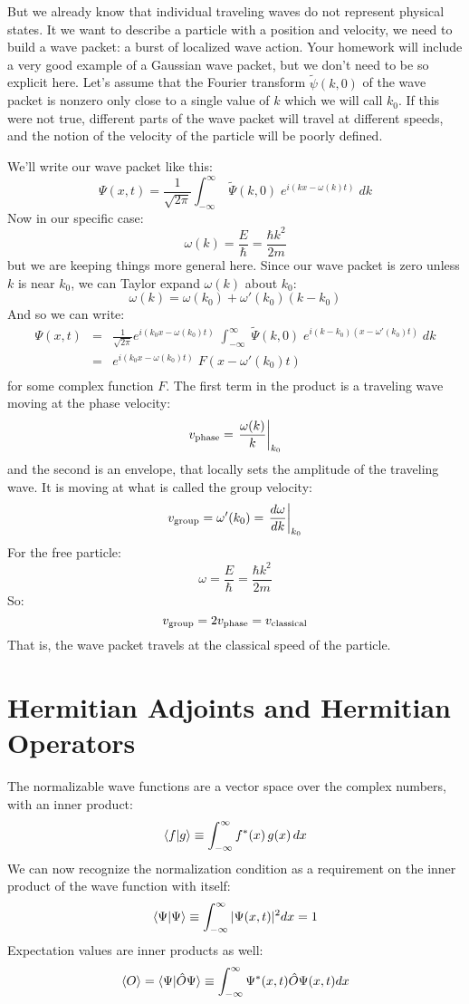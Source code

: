 \documentclass[12pt]{book}
\begin{document}
But we already know that individual traveling waves do not represent
physical states.  It we want to describe a particle with a position
and velocity, we need to build a wave packet: a burst of localized
wave action.  Your homework will include a very good example of a
Gaussian wave packet, but we don't need to be so explicit here.  Let's
assume that the Fourier transform $\widetilde{\psi}(k,0)$ of the wave
packet is nonzero only close to a single value of $k$ which we will
call $k_0$.  If this were not true, different parts of the wave packet
will travel at different speeds, and the notion of the velocity of the
particle will be poorly defined.

We'll write our wave packet like this:
$$ \Psi(x,t) = \frac{1}{\sqrt{2\pi}} \int_{-\infty}^{\infty} \; \widetilde{\Psi}(k,0) \;  
e^{\displaystyle i(kx - \omega(k)t)}\; dk $$
Now in our specific case:
$$\omega(k) = \frac{E}{\hbar} = \frac{\hbar k^2}{2m}$$
but we are keeping things more general here.  Since our wave packet is
zero unless $k$ is near $k_0$, we can Taylor expand $\omega(k)$ about
$k_0$:
$$\omega(k) = \omega(k_0) + \omega'(k_0) (k - k_0) $$
And so we can write:
\begin{eqnarray*}
\Psi(x,t) &=& \frac{1}{\sqrt{2\pi}} 
e^{\displaystyle i(k_0x - \omega(k_0)t)}\;
\int_{-\infty}^{\infty} \; \widetilde{\Psi}(k,0) \;  
e^{\displaystyle i(k-k_0)(x - \omega'(k_0)t)}\; dk\\ 
&=& e^{\displaystyle i(k_0x - \omega(k_0)t)}\; F(x - \omega'(k_0)t)\\
\end{eqnarray*}
for some complex function $F$.  The first term in the product is a traveling wave moving at the phase velocity:
$$v_{\rm phase} = \left. \frac{\omega(k)}{k} \right\rvert_{k_0}$$
and the second is an envelope, that locally sets the amplitude of the traveling wave.  It is moving at what is called the group velocity:
$$ v_{\rm group} = \omega'(k_0) = \left. \frac{d\omega}{dk} \right\rvert_{k_0}$$
For the free particle:
$$\omega = \frac{E}{\hbar} = \frac{\hbar k^2}{2m}$$
So:
$$v_{\rm group} = 2 v_{\rm phase} = v_{\rm classical}$$
That is, the wave packet travels at the classical speed of the particle.

\section{Hermitian Adjoints and Hermitian Operators}
The normalizable wave functions are a vector space over the complex numbers, with an inner product:
\begin{equation}
\braket{f|g} \equiv \int_{-\infty}^{\infty} f^*(x) \, g(x) \, dx
\end{equation}
We can now recognize the normalization condition as a requirement on the inner product of the wave function with itself:
\begin{equation}
\braket{\Psi|\Psi} \equiv \int_{-\infty}^{\infty} |\Psi(x,t)|^2 dx = 1
\end{equation}
Expectation values are inner products as well:
\begin{equation}
\braket{O} = \braket{\Psi|\hat{O}\Psi} \equiv \int_{-\infty}^{\infty} \Psi^*(x,t)\hat{O}\Psi(x,t) dx
\end{equation}
\end{document}
